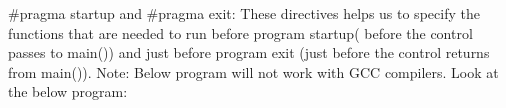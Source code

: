 \#pragma startup and \#pragma exit: These directives helps us to specify the functions that are needed to run before program startup( before the control passes to main()) and just before program exit (just before the control returns from main()).
Note: Below program will not work with GCC compilers.
Look at the below program:

\fi 